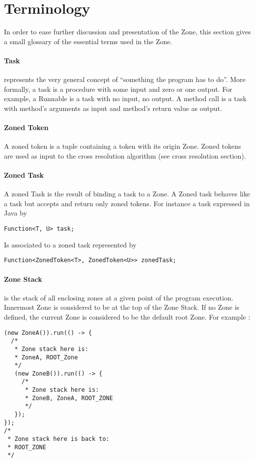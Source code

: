 \section{Terminology}

In order to ease further discussion and presentation of the Zone, this section gives a small glossary of the essential terms used in the Zone.


\paragraph{Task} represents the very general concept of ``something the program has to do''. More formally, a task is a procedure with some input and zero or one output. For example, a Runnable is a task with no input, no output. A method call is a task with method's arguments as input and method's return value as output.

\paragraph{Zoned Token} A zoned token is a tuple containing a token with its origin Zone. Zoned tokens are used as input to the cross resolution algorithm (see cross resolution section).

\paragraph{Zoned Task} A zoned Task is the result of binding a task to a Zone. A Zoned task behaves like a task but accepts and return only zoned tokens. For instance a task expressed in Java by
\begin{lstlisting}
Function<T, U> task;
\end{lstlisting}
Is associated to a zoned task represented by
\begin{lstlisting}
Function<ZonedToken<T>, ZonedToken<U>> zonedTask;
\end{lstlisting}

\paragraph{Zone Stack} is the stack of all enclosing zones at a given point of the program execution. Innermost Zone is considered to be at the top of the Zone Stack. If no Zone is defined, the current Zone is considered to be the default root Zone. For example :

\begin{lstlisting}
(new ZoneA()).run(() -> {
  /*
   * Zone stack here is:
   * ZoneA, ROOT_Zone
   */
   (new ZoneB()).run(() -> {
     /*
      * Zone stack here is:
      * ZoneB, ZoneA, ROOT_ZONE
      */
   });
});
/*
 * Zone stack here is back to:
 * ROOT_ZONE
 */
\end{lstlisting}

